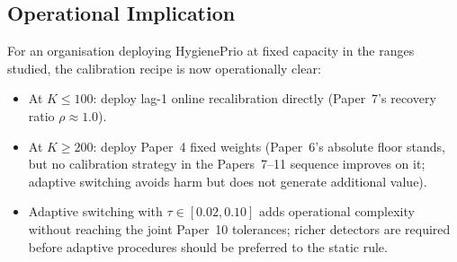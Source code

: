 \subsection{Operational Implication}

For an organisation deploying HygienePrio at fixed capacity in the
ranges studied, the calibration recipe is now operationally clear:
\begin{itemize}
\item At $K \leq 100$: deploy lag-1 online recalibration directly
(Paper~7's recovery ratio $\rho \approx 1.0$).
\item At $K \geq 200$: deploy Paper~4 fixed weights (Paper~6's
absolute floor stands, but no calibration strategy in the
Papers~7--11 sequence improves on it; adaptive switching avoids
harm but does not generate additional value).
\item Adaptive switching with $\tau \in [0.02, 0.10]$ adds
operational complexity without reaching the joint Paper~10
tolerances; richer detectors are required before adaptive procedures
should be preferred to the static rule.
\end{itemize}
